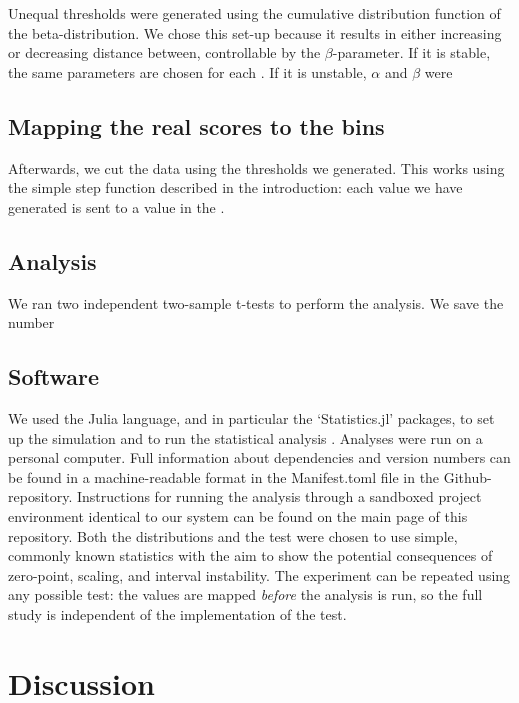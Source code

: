 \documentclass[utf8]{FrontiersinVancouver}
\begin{document}
Unequal thresholds were generated using the cumulative distribution function of the beta-distribution. We chose this set-up because it results in either increasing or decreasing distance between, controllable by the $\beta$-parameter. If it is stable, the same parameters are chosen for each . If it is unstable, $\alpha$ and $\beta$ were 

\subsection{Mapping the real scores to the bins}
Afterwards, we cut the data using the thresholds we generated. This works using the simple step function described in the introduction: each value we have generated is sent to a value in the . 

\subsection{Analysis}
We ran two independent two-sample t-tests to perform the analysis. We save the number 

\subsection{Software}
We used the Julia language, and in particular the `Statistics.jl' packages, to set up the simulation and to run the statistical analysis \citep{bezanson2017julia}. Analyses were run on a personal computer.  Full information about dependencies and version numbers can be found in a machine-readable format in the Manifest.toml file in the Github-repository. Instructions for running the analysis through a sandboxed project environment identical to our system can be found on the main page of this repository. Both the distributions and the test were chosen to use simple, commonly known statistics with the aim to show the potential consequences of zero-point, scaling, and interval instability. The experiment can be repeated using any possible test: the values are mapped \textit{before} the analysis is run, so the full study is independent of the implementation of the test.



\section{Discussion}
\end{document}
